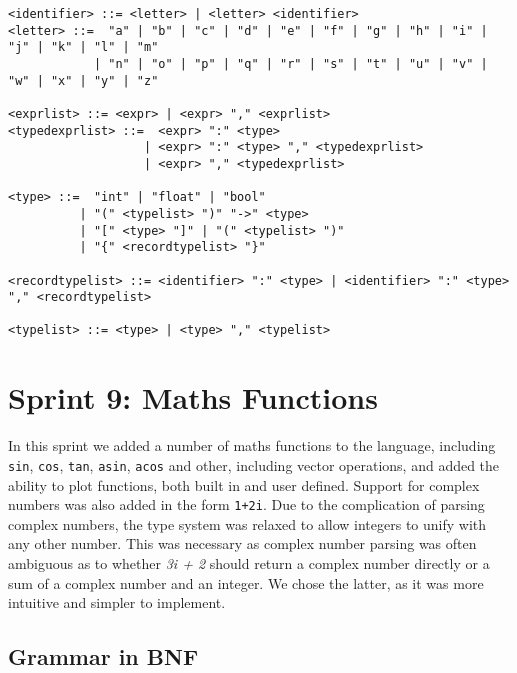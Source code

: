 \begin{verbatim}
<identifier> ::= <letter> | <letter> <identifier>
<letter> ::=  "a" | "b" | "c" | "d" | "e" | "f" | "g" | "h" | "i" | "j" | "k" | "l" | "m" 
            | "n" | "o" | "p" | "q" | "r" | "s" | "t" | "u" | "v" | "w" | "x" | "y" | "z"

<exprlist> ::= <expr> | <expr> "," <exprlist>
<typedexprlist> ::=  <expr> ":" <type> 
                   | <expr> ":" <type> "," <typedexprlist>
                   | <expr> "," <typedexprlist>
    
<type> ::=  "int" | "float" | "bool" 
          | "(" <typelist> ")" "->" <type> 
          | "[" <type> "]" | "(" <typelist> ")"
          | "{" <recordtypelist> "}"
          
<recordtypelist> ::= <identifier> ":" <type> | <identifier> ":" <type> "," <recordtypelist>

<typelist> ::= <type> | <type> "," <typelist>
\end{verbatim}

\section{Sprint 9: Maths Functions}\label{sec:maths-funcs}

In this sprint we added a number of maths functions to the language, including \texttt{sin}, \texttt{cos}, \texttt{tan},
\texttt{asin}, \texttt{acos} and other, including vector operations, and added the ability to plot functions, both 
built in and user defined.
Support for complex numbers was also added in the form \texttt{1+2i}.
Due to the complication of parsing complex numbers, the type system was relaxed to allow integers to unify with any 
other number.
This was necessary as complex number parsing was often ambiguous as to whether \textit{3i + 2} should return a 
complex number directly or a sum of a complex number and an integer.
We chose the latter, as it was more intuitive and simpler to implement.

\subsection{Grammar in BNF}\label{subsec:grammar-in-bnf9}

